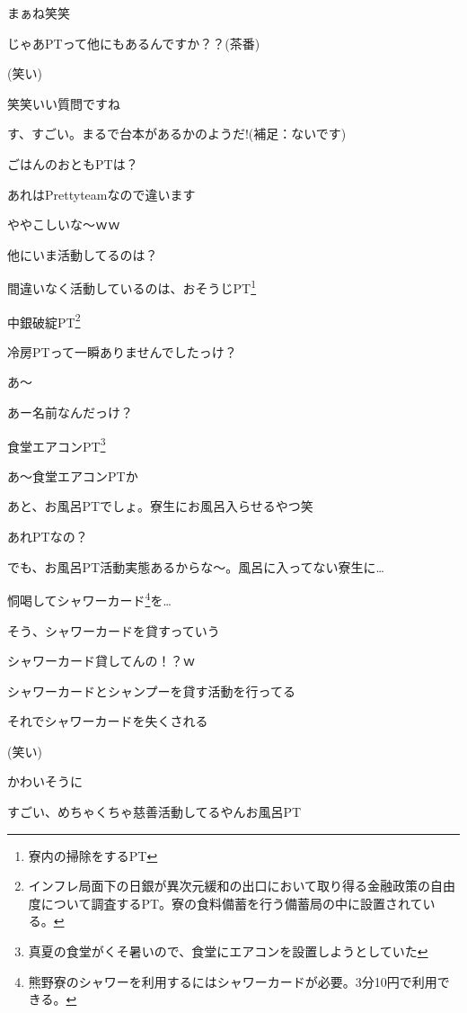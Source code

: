 \begin{multicols}{2}
まぁね笑笑

じゃあPTって他にもあるんですか？？(茶番)

(笑い)

笑笑いい質問ですね

す、すごい。まるで台本があるかのようだ!(補足：ないです)

ごはんのおともPTは？

あれはPrettyteamなので違います

ややこしいな〜ｗｗ

他にいま活動してるのは？

間違いなく活動しているのは、おそうじPT\footnote{寮内の掃除をするPT}

中銀破綻PT\footnote{インフレ局面下の日銀が異次元緩和の出口において取り得る金融政策の自由度について調査するPT。寮の食料備蓄を行う備蓄局の中に設置されている。}

冷房PTって一瞬ありませんでしたっけ？

あ〜

あー名前なんだっけ？

食堂エアコンPT\footnote{真夏の食堂がくそ暑いので、食堂にエアコンを設置しようとしていた}

あ〜食堂エアコンPTか

あと、お風呂PTでしょ。寮生にお風呂入らせるやつ笑

あれPTなの？

でも、お風呂PT活動実態あるからな〜。風呂に入ってない寮生に…

恫喝してシャワーカード\footnote{熊野寮のシャワーを利用するにはシャワーカードが必要。3分10円で利用できる。}を…

そう、シャワーカードを貸すっていう

シャワーカード貸してんの！？ｗ

シャワーカードとシャンプーを貸す活動を行ってる

それでシャワーカードを失くされる

(笑い)

かわいそうに

すごい、めちゃくちゃ慈善活動してるやんお風呂PT


\end{multicols}
